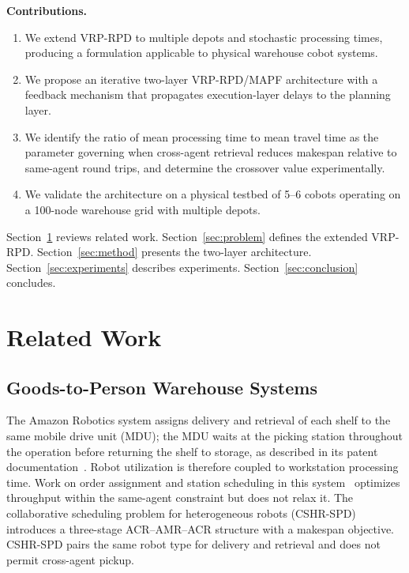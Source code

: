 \documentclass{article}
\begin{document}
\textbf{Contributions.}
\begin{enumerate}
    \item We extend VRP-RPD to multiple depots and stochastic processing times,
    producing a formulation applicable to physical warehouse cobot systems.
    \item We propose an iterative two-layer VRP-RPD/MAPF architecture with a
    feedback mechanism that propagates execution-layer delays to the planning
    layer.
    \item We identify the ratio of mean processing time to mean travel time as
    the parameter governing when cross-agent retrieval reduces makespan relative
    to same-agent round trips, and determine the crossover value experimentally.
    \item We validate the architecture on a physical testbed of 5--6 cobots
    operating on a 100-node warehouse grid with multiple depots.
\end{enumerate}

Section~\ref{sec:related} reviews related work. Section~\ref{sec:problem}
defines the extended VRP-RPD. Section~\ref{sec:method} presents the two-layer
architecture. Section~\ref{sec:experiments} describes experiments.
Section~\ref{sec:conclusion} concludes.

\section{Related Work}
\label{sec:related}

\subsection{Goods-to-Person Warehouse Systems}

The Amazon Robotics system assigns delivery and retrieval of each shelf to the
same mobile drive unit (MDU); the MDU waits at the picking station throughout
the operation before returning the shelf to storage, as described in its patent
documentation~\cite{kiva_patent_2014}. Robot utilization is therefore coupled
to workstation processing time. Work on order assignment and station scheduling
in this system~\cite{kiva_order_scheduling} optimizes throughput within the
same-agent constraint but does not relax it. The collaborative scheduling
problem for heterogeneous robots (CSHR-SPD)~\cite{cshr_spd_2025} introduces a
three-stage ACR--AMR--ACR structure with a makespan objective. CSHR-SPD pairs
the same robot type for delivery and retrieval and does not permit cross-agent
pickup.
\end{document}
